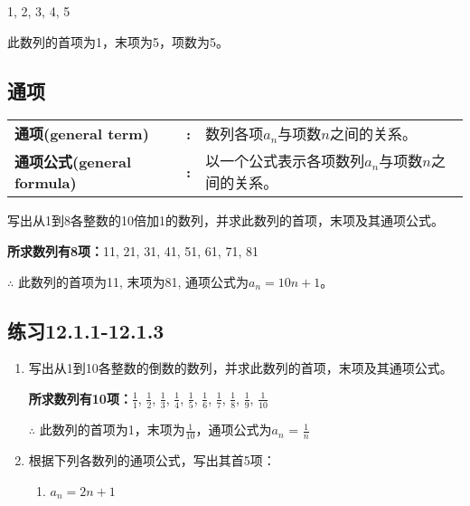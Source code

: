 \documentclass[9pt]{article}
\begin{document}
\begin{multicols}{2}
\begin{small}
        \noindent\example{}1, 2, 3, 4, 5

        \sol{} 此数列的首项为1，末项为5，项数为5。

        \subsection{通项}

        \begin{center}
            \begin{tabular}{@{}p{12.8em}p{0.1em}p{12em}@{}}
                \textbf{通项(general term)}        & \textbf{:} & 数列各项$a_n$与项数$n$之间的关系。               \\
                \textbf{通项公式(general formula)} & \textbf{:} & 以一个公式表示各项数列$a_n$与项数$n$之间的关系。 \\

            \end{tabular}
        \end{center}
        \hfill \break
        \noindent\example{}写出从1到8各整数的10倍加1的数列，并求此数列的首项，末项及其通项公式。

        \sol{}

        \noindent\textbf{所求数列有8项：}11, 21, 31, 41, 51, 61, 71, 81

        \noindent$\therefore$ 此数列的首项为11, 末项为81, 通项公式为$a_n = 10n+1$。

        \subsection*{练习12.1.1-12.1.3}

        \begin{enumerate}
            \item 写出从1到10各整数的倒数的数列，并求此数列的首项，末项及其通项公式。

                  \sol{}

                  \textbf{所求数列有10项：}$\frac{1}{1}$, $\frac{1}{2}$, $\frac{1}{3}$, $\frac{1}{4}$, $\frac{1}{5}$, $\frac{1}{6}$, $\frac{1}{7}$, $\frac{1}{8}$, $\frac{1}{9}$, $\frac{1}{10}$

                  $\therefore$ 此数列的首项为1，末项为$\frac{1}{10}$，通项公式为$a_n$ = $\frac{1}n$

            \item 根据下列各数列的通项公式，写出其首5项：

                  \begin{enumerate}
                      \item $a_n = 2n+1$


\end{enumerate}
\end{enumerate}
\end{small}
\end{multicols}
\end{document}
